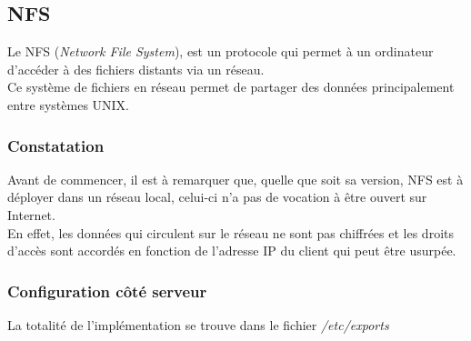 \subsection{NFS}
\label{subsec:nfs}

Le NFS (\emph{Network File System}), est un protocole qui permet à un ordinateur
d'accéder à des fichiers distants via un réseau. \\
Ce système de fichiers en réseau permet de partager des données principalement
entre systèmes UNIX.

\subsubsection{Constatation}
\label{subsubsec:constatation}

Avant de commencer, il est à remarquer que, quelle que soit sa version, NFS est
à déployer dans un réseau local, celui-ci n'a pas de vocation à être ouvert sur
Internet. \\ En effet, les données qui circulent sur le réseau ne sont pas
chiffrées et les droits d'accès sont accordés en fonction de l'adresse IP du
client qui peut être usurpée.

\subsubsection{Configuration côté serveur}
\label{subsubsec:config-serveur}

La totalité de l'implémentation se trouve dans le fichier
\textit{/etc/exports}


